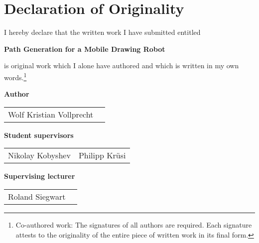 
\section*{Declaration of Originality}

\vspace{1cm}

I hereby declare that the written work I have submitted entitled

\vspace{0.3cm}

\textbf{Path Generation for a Mobile Drawing Robot}

\vspace{0.3cm}

is original work which I alone have authored and which is written in my own words.\footnote{Co-authored work: The signatures of all authors are required. Each signature attests to the originality of the entire piece of written work in its final form.}

\vspace{0.8cm}

\textbf{Author}

\vspace{0.5cm}

\begin{tabular}{ p{5cm} p{5cm} }
  Wolf Kristian Vollprecht & \\
\end{tabular}

\vspace{0.3cm}

\textbf{Student supervisors}

\vspace{0.5cm}

\begin{tabular}{ p{5cm} p{5cm} }
  Nikolay Kobyshev & Philipp Krüsi \\
\end{tabular}

\vspace{0.3cm}

\textbf{Supervising lecturer}

\vspace{0.5cm}

\begin{tabular}{ p{5cm} p{5cm} }
  Roland Siegwart & \\
\end{tabular}

